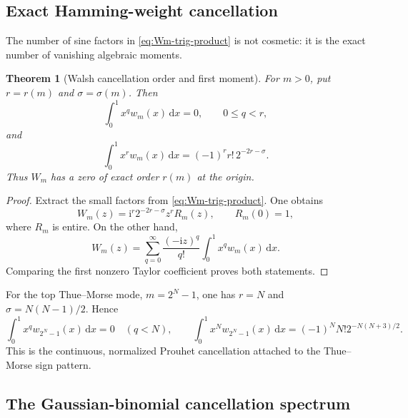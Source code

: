 \documentclass[11pt,oneside]{article}
\newtheorem{theorem}{Theorem}[section]
\theoremstyle{definition}
\theoremstyle{remark}
\newcommand{\ii}{\mathrm i}
\newcommand{\dd}{\,\mathrm d}
\begin{document}
\subsection{Exact Hamming-weight cancellation}

The number of sine factors in \eqref{eq:Wm-trig-product} is not cosmetic: it is
the exact number of vanishing algebraic moments.

\begin{theorem}[Walsh cancellation order and first moment]
\label{thm:Walsh-moment-cancellation}
For $m>0$, put $r=r(m)$ and $\sigma=\sigma(m)$.  Then
\begin{equation}\label{eq:Walsh-vanishing-moments}
 \int_0^1x^qw_m(x)\dd x=0,
 \qquad 0\le q<r,
\end{equation}
and
\begin{equation}\label{eq:Walsh-first-moment}
 \int_0^1x^rw_m(x)\dd x
 =(-1)^rr!\,2^{-2r-\sigma}.
\end{equation}
Thus $W_m$ has a zero of exact order $r(m)$ at the origin.
\end{theorem}

\begin{proof}
Extract the small factors from \eqref{eq:Wm-trig-product}.  One obtains
\begin{equation}\label{eq:Wm-factorized-origin}
 W_m(z)=\ii^r2^{-2r-\sigma}z^rR_m(z),
 \qquad R_m(0)=1,
\end{equation}
where $R_m$ is entire.  On the other hand,
\begin{equation}\label{eq:Wm-moment-Taylor}
 W_m(z)=\sum_{q=0}^\infty\frac{(-\ii z)^q}{q!}
 \int_0^1x^qw_m(x)\dd x.
\end{equation}
Comparing the first nonzero Taylor coefficient proves both statements.
\end{proof}

For the top Thue--Morse mode, $m=2^N-1$, one has $r=N$ and
$\sigma=N(N-1)/2$.  Hence
\begin{equation}\label{eq:Thue-Morse-moment}
 \int_0^1x^qw_{2^N-1}(x)\dd x=0\quad(q<N),
 \qquad
 \int_0^1x^Nw_{2^N-1}(x)\dd x
 =(-1)^NN!2^{-N(N+3)/2}.
\end{equation}
This is the continuous, normalized Prouhet cancellation attached to the
Thue--Morse sign pattern.

\subsection{The Gaussian-binomial cancellation spectrum}
\end{document}
